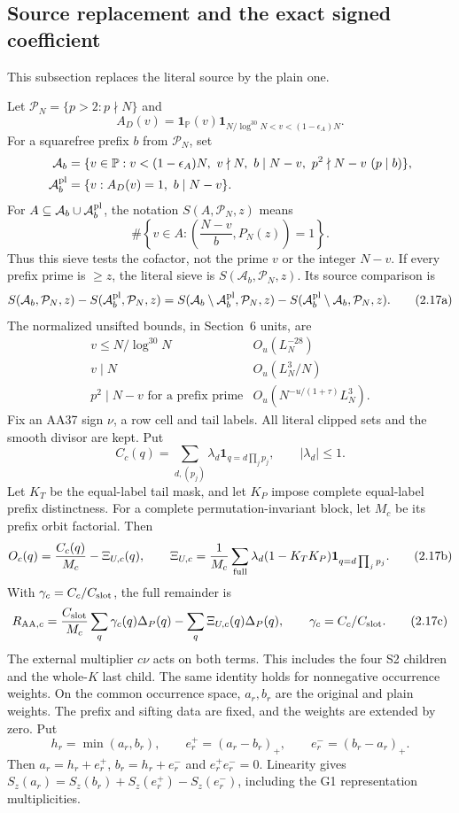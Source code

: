 \subsection{Source replacement and the exact signed coefficient}
This subsection replaces the literal source by the plain one.
\begin{lemma}
\label{lem:source-replacement}
Let $\mathcal P_N=\{p>2:p\nmid N\}$ and
\[
 A_D(v)=\mathbf1_{\mathbb P}(v)
 \mathbf1_{N/\log^{30}N<v<(1-\epsilon_A)N}.
\]
For a squarefree prefix $b$ from $\mathcal P_N$, set
\[
\begin{aligned}
\mathcal A_b&=\{v\in\mathbb P:v<(1-\epsilon_A)N,\ v\nmid N,\ b\mid N-v,
                         \ p^2\nmid N-v\ (p\mid b)\},\\
\mathcal A_b^{\rm pl}&=\{v:A_D(v)=1,\ b\mid N-v\}.
\end{aligned}
\]
For $A\subseteq\mathcal A_b\cup\mathcal A_b^{\rm pl}$, the notation
$S(A,\mathcal P_N,z)$ means
\[
 \#\left\{v\in A:\left(\frac{N-v}{b},P_N(z)\right)=1\right\}.
\]
Thus this sieve tests the cofactor, not the prime $v$ or the integer $N-v$.
If every prefix prime is $\ge z$, the literal sieve is
$S(\mathcal A_b,\mathcal P_N,z)$. Its source comparison is
\[
 S(\mathcal A_b,\mathcal P_N,z)-S(\mathcal A_b^{\rm pl},\mathcal P_N,z)
 =S(\mathcal A_b\setminus\mathcal A_b^{\rm pl},\mathcal P_N,z)
  -S(\mathcal A_b^{\rm pl}\setminus\mathcal A_b,\mathcal P_N,z).
 \tag{2.17a}\label{p2:eq:direct-source-comparison}
\]
The normalized unsifted bounds, in Section~6 units, are
\[
\begin{array}{c|c}
v\le N/\log^{30}N&O_u(L_N^{-28})\\
v\mid N&O_u(L_N^3/N)\\
p^2\mid N-v\text{ for a prefix prime}&O_u(N^{-u/(1+\tau)}L_N^3).
\end{array}
\]
Fix an AA37 sign $\nu$, a row cell and tail labels.
All literal clipped sets and the smooth divisor are kept. Put
\[
 C_c(q)=\sum_{d,(p_j)}\lambda_d\mathbf1_{q=d\prod_jp_j},\qquad |\lambda_d|\le1.
\]
Let $K_T$ be the equal-label tail mask,
and let $K_P$ impose complete equal-label prefix distinctness.
For a complete permutation-invariant block, let $M_c$ be its prefix orbit factorial.
Then
\[
 O_c(q)=\frac{C_c(q)}{M_c}-\Xi_{U,c}(q),\qquad
 \Xi_{U,c}=\frac1{M_c}\sum_{\rm full}\lambda_d(1-K_TK_P)
                  \mathbf1_{q=d\prod_jp_j}.
 \tag{2.17b}\label{p2:eq:direct-c1}
\]
With $\gamma_c=C_c/C_{\rm slot}$, the full remainder is
\[
 R_{{\rm AA},c}=\frac{C_{\rm slot}}{M_c}
       \sum_q\gamma_c(q)\Delta_P(q)
       -\sum_q\Xi_{U,c}(q)\Delta_P(q),
 \qquad \gamma_c=C_c/C_{\rm slot}.
 \tag{2.17c}\label{p2:eq:direct-remainder}
\]
The external multiplier $c\nu$ acts on both terms.
This includes the four S2 children and the whole-$K$ last child.
The same identity holds for nonnegative occurrence weights.
On the common occurrence space, $a_r,b_r$ are the original and plain weights.
The prefix and sifting data are fixed, and the weights are extended by zero. Put
\[
 h_r=\min(a_r,b_r),\qquad
 e_r^+=(a_r-b_r)_+,\qquad e_r^-=(b_r-a_r)_+.
\]
Then $a_r=h_r+e_r^+$, $b_r=h_r+e_r^-$ and $e_r^+e_r^-=0$.
Linearity gives $S_z(a_r)=S_z(b_r)+S_z(e_r^+)-S_z(e_r^-)$,
including the G1 representation multiplicities.
\end{lemma}
